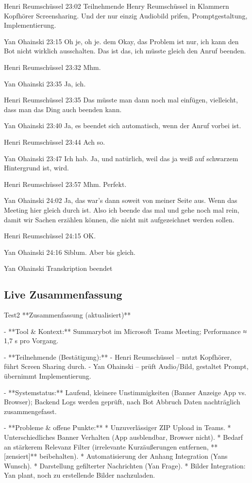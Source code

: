 Henri Reumschüssel   23:02
Teilnehmende Henry Reumschüssel in Klammern Kopfhörer Screensharing.
Und der nur einzig Audiobild prìfen, Promptgestaltung, Implementierung.

Yan Ohainski   23:15
Oh je, oh je.
dem
Okay, das Problem ist nur, ich kann den Bot nicht wirklich ausschalten.
Das ist das, ich müsste gleich den Anruf beenden.

Henri Reumschüssel   23:32
Mhm.

Yan Ohainski   23:35
Ja, ich.

Henri Reumschüssel   23:35
Das müsste man dann noch mal einfügen, vielleicht, dass man das Ding auch beenden kann.

Yan Ohainski   23:40
Ja, es beendet sich automatisch, wenn der Anruf vorbei ist.

Henri Reumschüssel   23:44
Ach so.

Yan Ohainski   23:47
Ich hab.
Ja, und natürlich, weil das ja weiß auf schwarzem Hintergrund ist, wird.

Henri Reumschüssel   23:57
Mhm.
Perfekt.

Yan Ohainski   24:02
Ja, das war's dann soweit von meiner Seite aus.
Wenn das Meeting hier gleich durch ist.
Also ich beende das mal und gehe noch mal rein, damit wir Sachen erzählen können, die nicht mit aufgezeichnet werden sollen.

Henri Reumschüssel   24:15
OK.

Yan Ohainski   24:16
Siblum.
Aber bis gleich.

Yan Ohainski Transkription beendet

\subsection{Live Zusammenfassung}
\label{app:Weekly_live}
Test2
**Zusammenfassung (aktualisiert)**  

- **Tool \& Kontext:** Summarybot im Microsoft Teams Meeting; Performance ≈ 1,7 s pro Vorgang.  

- **Teilnehmende (Bestätigung):**  
  - Henri Reumschüssel – nutzt Kopfhörer, führt Screen Sharing durch.  
  - Yan Ohainski – prüft Audio/Bild, gestaltet Prompt, übernimmt Implementierung.  

- **Systemstatus:** Laufend, kleinere Unstimmigkeiten (Banner Anzeige App vs. Browser); Backend Logs werden geprüft, nach Bot Abbruch Daten nachträglich zusammengefasst.  

- **Probleme \& offene Punkte:**  
  * Unzuverlässiger ZIP Upload in Teams.  
  * Unterschiedliches Banner Verhalten (App ausblendbar, Browser nicht).  
  * Bedarf an stärkerem Relevanz Filter (irrelevante Kurzäußerungen entfernen, **[zensiert]** beibehalten).  
  * Automatisierung der Anhang Integration (Yans Wunsch).  
  * Darstellung gefilterter Nachrichten (Yan Frage).  
  * Bilder Integration: Yan plant, noch zu erstellende Bilder nachzuladen.  

